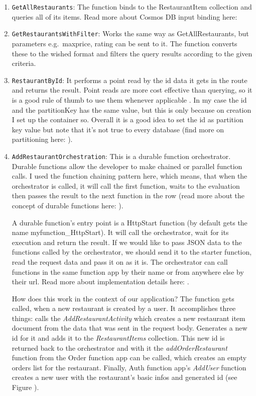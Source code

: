 \begin{enumerate}
	\item \verb+GetAllRestaurants+: The function binds to the RestaurantItem collection and queries all of its items. Read more about Cosmos DB input binding here: \cite{CosmosDBInputBinding}
	\item \verb+GetRestaurantsWithFilter+: Works the same way as GetAllRestaurants, but parameters e.g.\ maxprice, rating can be sent to it. The function converts these to the wished format and filters the query results according to the given criteria.
	
	\item \verb+RestaurantById+: 
	It performs a point read by the id data it gets in the route and returns the result. Point reads are more cost effective than querying, so it is a good rule of thumb to use them whenever applicable \cite{CosmosDBCostOpt}. In my case the id and the partitionKey has the same value, but this is only because on creation I set up the container so. Overall it is a good idea to set the id as partition key value but note that it's not true to every database (find more on partitioning here: \cite{CosmosDBPartitioning}). 
	
	\item \verb+AddRestaurantOrchestration+: 
	This is a durable function orchestrator. Durable functions allow the developer to make chained or parallel function calls. I used the function chaining pattern here, which means, that when the orchestrator is called, it will call the first function, waits to the evaluation then passes the result to the next function in the row (read more about the concept of durable functions here: \cite{DurableFunctions}).
	
	A durable function's entry point is a HttpStart function (by default gets the name myfunction\_HttpStart). It will call the orchestrator, wait for its execution and return the result. If we would like to pass JSON data to the functions called by the orchestrator, we should send it to the starter function, read the request data and pass it on as it is. The orchestrator can call functions in the same function app by their name or from anywhere else by their url. Read more about implementation details here: \cite{DurableFunctionsImplement}.
	
	How does this work in the context of our application? The function gets called, when a new restaurant is created by a user. It accomplishes three things: calls the \emph{AddRestaurantActivity} which creates a new restaurant item document from the data that was sent in the request body. Generates a new id for it and adds it to the \emph{RestaurantItems} collection. This new id is returned back to the orchestrator and with it the \emph{addOrderRestaurant} function from the Order function app can be called, which creates an empty orders list for the restaurant. Finally, Auth function app's \emph{AddUser} function creates a new user with the restaurant's basic infos and generated id (see Figure ).	
	

\end{enumerate}
